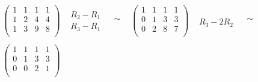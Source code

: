 \documentclass[tikz, 12pt]{scrartcl}
\begin{document}
\begin{equation}\label{stepsToSolveSystemForNaiveKK}
			\begin{split}
				\begin{array}{cccccc}
					\left(
					\begin{array}{ccc|c}
						1	&	1	&	1	&	1 \\
						1	&	2	&	4	&	4 \\
						1	&	3	&	9	&	8 \\
					\end{array}
					\right)
					&
					\begin{array}{c}
									\\
					R_2 - R_1		 \\
					R_3 - R_1		\\
					\end{array}
					&
					\begin{array}{c}
					 \\
					 \sim\\
					 \\
					\end{array}
					&
					\left(
					\begin{array}{ccc|c}
						1	&	1	&	1	&	1 \\
						0	&	1	&	3	&	3 \\
						0	&	2	&	8	&	7 \\
					\end{array}
					\right)
					&
					\begin{array}{c}
								\\
								 \\
					R_3 - 2R_2	\\
					\end{array}
					&
					\begin{array}{c}
					 \\
					 \sim\\
					 \\
					\end{array}
					\\
					\\
					\left(
					\begin{array}{ccc|c}
						1	&	1	&	1	&	1 \\
						0	&	1	&	3	&	3 \\
						0	&	0	&	2	&	1 \\
					\end{array}
					\right)
					&
					\begin{array}{c}
									\\

\end{array}
\end{array}
\end{split}
\end{equation}
\end{document}
